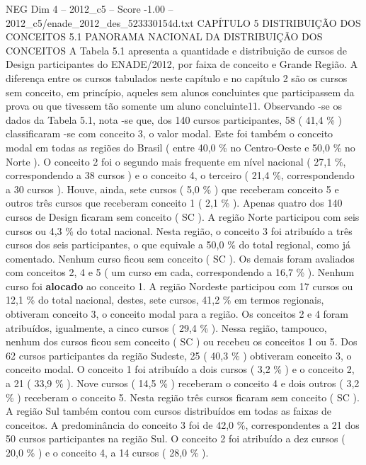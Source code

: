 \begin{textsample}{NEG Dim 4 – 2012\_c5 – Score -1.00 – 2012\_c5/enade\_2012\_des\_523330154d.txt}  \label{ex:f4_neg_108}
CAPÍTULO 5 DISTRIBUIÇÃO DOS CONCEITOS 5.1 PANORAMA NACIONAL DA DISTRIBUIÇÃO DOS CONCEITOS A Tabela 5.1 apresenta a quantidade e distribuição de cursos de Design participantes do ENADE/2012, por faixa de conceito e Grande Região.
A diferença entre os cursos tabulados neste capítulo e no capítulo 2 são os cursos sem conceito, em princípio, aqueles sem alunos concluintes que participassem da prova ou que tivessem tão somente um aluno concluinte11.
Observando -se os dados da Tabela 5.1, nota -se que, dos 140 cursos participantes, 58 ( 41,4 \% ) classificaram -se com conceito 3, o valor modal.
Este foi também o conceito modal em todas as regiões do Brasil ( entre 40,0 \% no Centro-Oeste e 50,0 \% no Norte ).
O conceito 2 foi o segundo mais frequente em nível nacional ( 27,1 \%, correspondendo a 38 cursos ) e o conceito 4, o terceiro ( 21,4 \%, correspondendo a 30 cursos ).
Houve, ainda, sete cursos ( 5,0 \% ) que receberam conceito 5 e outros três cursos que receberam conceito 1 ( 2,1 \% ).
Apenas quatro dos 140 cursos de Design ficaram sem conceito ( SC ).
A região Norte participou com seis cursos ou 4,3 \% do total nacional.
Nesta região, o conceito 3 foi atribuído a três cursos dos seis participantes, o que equivale a 50,0 \% do total regional, como já comentado.
Nenhum curso ficou sem conceito ( SC ).
Os demais foram avaliados com conceitos 2, 4 e 5 ( um curso em cada, correspondendo a 16,7 \% ).
Nenhum curso foi \textbf{alocado} ao conceito 1.
A região Nordeste participou com 17 cursos ou 12,1 \% do total nacional, destes, sete cursos, 41,2 \% em termos regionais, obtiveram conceito 3, o conceito modal para a região.
Os conceitos 2 e 4 foram atribuídos, igualmente, a cinco cursos ( 29,4 \% ).
Nessa região, tampouco, nenhum dos cursos ficou sem conceito ( SC ) ou recebeu os conceitos 1 ou 5.
Dos 62 cursos participantes da região Sudeste, 25 ( 40,3 \% ) obtiveram conceito 3, o conceito modal.
O conceito 1 foi atribuído a dois cursos ( 3,2 \% ) e o conceito 2, a 21 ( 33,9 \% ).
Nove cursos ( 14,5 \% ) receberam o conceito 4 e dois outros ( 3,2 \% ) receberam o conceito 5.
Nesta região três cursos ficaram sem conceito ( SC ).
A região Sul também contou com cursos distribuídos em todas as faixas de conceitos.
A predominância do conceito 3 foi de 42,0 \%, correspondentes a 21 dos 50 cursos participantes na região Sul.
O conceito 2 foi atribuído a dez cursos ( 20,0 \% ) e o conceito 4, a 14 cursos ( 28,0 \% ).

\end{textsample}
